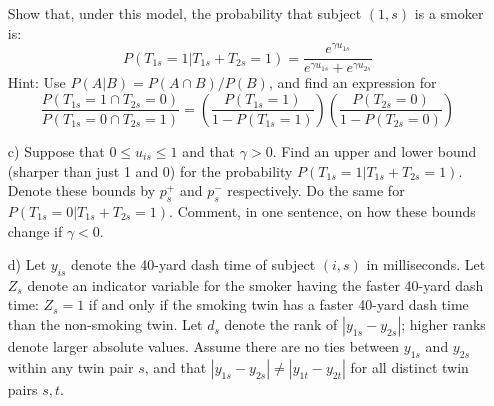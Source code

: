 \documentclass{article}
\begin{document}
\begin{itemize}
          Show that, under this model, the probability
          that subject $(1,s)$ is a smoker is:
          \begin{equation}
            P(T_{1s} = 1| T_{1s} + T_{2s} = 1) 
            = \frac{e^{\gamma u_{1s}}}{e^{\gamma u_{1s}} + e^{\gamma u_{2s}}}
            \label{aprobques}
          \end{equation}
          Hint: Use $P(A | B) = P(A\cap B)/P(B)$, and find an expression for
          $$
            \frac{P(T_{1s} = 1 \cap T_{2s} = 0)}{P(T_{1s} = 0 \cap T_{2s} = 1)} = 
            \left(\frac{P(T_{1s} = 1)}{1 - P(T_{1s} = 1)}\right)
            \left(\frac{P(T_{2s} = 0)}{1 - P(T_{2s} = 0)}\right)
          $$
        \item[c)]
          Suppose that $0 \leq u_{is} \leq 1$ and that $\gamma > 0$.
          Find an upper and lower bound (sharper than just 1 and 0) for the probability
          $P(T_{1s} = 1| T_{1s} + T_{2s} = 1).$
          Denote these bounds by $p^+_s$ and $p^-_s$ respectively.
          Do the same for $P(T_{1s} = 0| T_{1s} + T_{2s} = 1).$
          Comment, in one sentence, on how these bounds change if $\gamma < 0$.
        \item[d)]
          Let $y_{is}$ denote the 40-yard dash time of subject $(i,s)$ in milliseconds.
          Let $Z_s$ denote an indicator variable for the smoker having the faster 40-yard dash time:
          $Z_s = 1$ if and only if the smoking twin 
          has a faster 40-yard dash time than the non-smoking twin.
          Let $d_s$ denote the rank of $|y_{1s} - y_{2s}|$; 
          higher ranks denote larger absolute values.
          Assume there are no ties between $y_{1s}$ and $y_{2s}$ within any 
          twin pair $s$,
          and that $|y_{1s} - y_{2s}| \neq |y_{1t} - y_{2t}|$ for all distinct twin pairs $s,t$.
          

\end{itemize}
\end{document}
